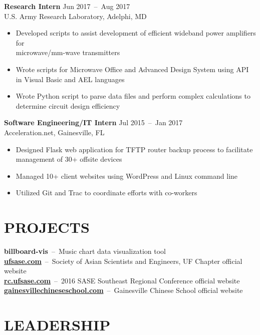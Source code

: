 \documentclass[line,resmargin]{res}
\begin{document}
\begin{resume}
    \textbf{Research Intern}    \hfill Jun 2017~--~Aug 2017 \\
    U.S. Army Research Laboratory, Adelphi, MD
    \begin{itemize}  \itemsep -2pt %
        \item Developed scripts to assist development of efficient wideband power amplifiers for
        \\microwave/mm-wave transmitters
        \item Wrote scripts for Microwave Office and Advanced Design System using API in Visual Basic and AEL languages
        \item Wrote Python script to parse data files and perform complex calculations to determine circuit design efficiency
    \end{itemize}

    \textbf{Software Engineering/IT Intern}    \hfill Jul 2015~--~Jan 2017 \\
    Acceleration.net, Gainesville, FL
    \begin{itemize}  \itemsep -2pt %
        \item Designed Flask web application for TFTP router backup process to facilitate management of 30+ offsite devices
        \item Managed 10+ client websites using WordPress and Linux command line
        \item Utilized Git and Trac to coordinate efforts with co-workers
    \end{itemize}

\section{PROJECTS}
    \textbf{billboard-vis}~--~Music chart data visualization tool \\
    \textbf{\href{http://ufsase.com}{ufsase.com}}~--~Society of Asian Scientists and Engineers, UF Chapter official website \\
    \textbf{\href{http://rc.ufsase.com}{rc.ufsase.com}}~--~2016 SASE Southeast Regional Conference official website \\
    \textbf{\href{https://gainesvillechineseschool.com}{gainesvillechineseschool.com}}~--~Gainesville Chinese School official website \\


\section{LEADERSHIP}


\end{resume}
\end{document}
